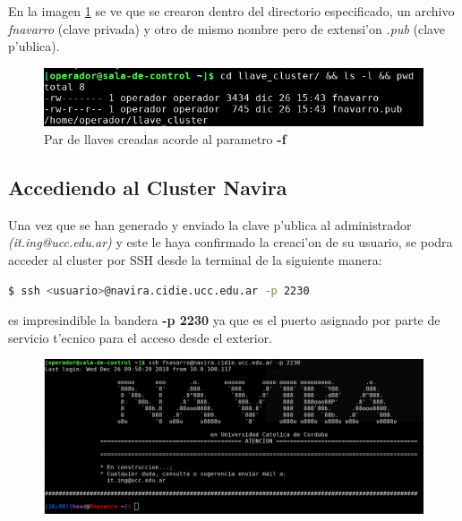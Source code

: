 \documentclass[a4paper]{scrartcl}
\begin{document}
En la imagen {\color{blue}\ref{fig:4}} se ve que se crearon dentro del directorio especificado, un archivo \textit{fnavarro} (clave privada) y otro de mismo nombre pero de extensi'on \textit{.pub} (clave p'ublica).
\begin{figure}[!ht]
  \includegraphics[scale=0.5]{./ssh_intro_imgs/D}
  \caption{Par de llaves creadas acorde al parametro \textbf{-f}}
  \label{fig:4}
\end{figure}

\subsection{Accediendo al Cluster Navira}
Una vez que se han generado y enviado la clave p'ublica al administrador \textit{(it.ing@ucc.edu.ar)} y este le haya confirmado la creaci'on de su usuario, se podra acceder al cluster por SSH desde la terminal de la siguiente manera:

\begin{lstlisting}[language=bash]
$ ssh <usuario>@navira.cidie.ucc.edu.ar -p 2230
\end{lstlisting}

es impresindible la bandera \textbf{-p 2230} ya que es el puerto asignado por parte de servicio t'ecnico para el acceso desde el exterior.

\begin{figure}[ht]
  \includegraphics[width=\columnwidth]{./ssh_intro_imgs/E}
  \caption{}
  \label{fig:5}
\end{figure}
\end{document}
